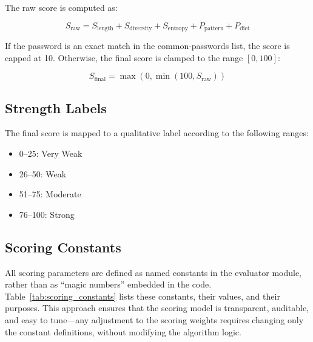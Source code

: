 The raw score is computed as:

\begin{equation}
S_{\text{raw}} = S_{\text{length}} + S_{\text{diversity}} + S_{\text{entropy}} + P_{\text{pattern}} + P_{\text{dict}}
\end{equation}

If the password is an exact match in the common-passwords list, the score is capped at 10. Otherwise, the final score is clamped to the range $[0, 100]$:

\begin{equation}
S_{\text{final}} = \max(0, \min(100, S_{\text{raw}}))
\end{equation}

\subsection{Strength Labels}

The final score is mapped to a qualitative label according to the following ranges:

\begin{itemize}
    \item 0--25: Very Weak
    \item 26--50: Weak
    \item 51--75: Moderate
    \item 76--100: Strong
\end{itemize}

\subsection{Scoring Constants}

All scoring parameters are defined as named constants in the evaluator module, rather than as ``magic numbers'' embedded in the code. Table~\ref{tab:scoring_constants} lists these constants, their values, and their purposes. This approach ensures that the scoring model is transparent, auditable, and easy to tune---any adjustment to the scoring weights requires changing only the constant definitions, without modifying the algorithm logic.

